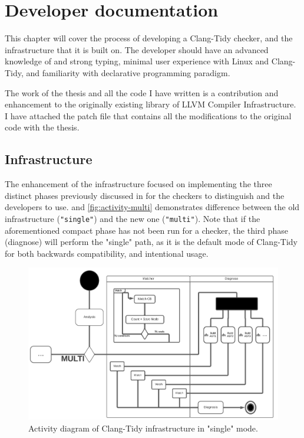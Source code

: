 
\chapter{Developer documentation}
\label{ch:impl}

This chapter will cover the process of developing a Clang-Tidy checker, and the infrastructure that it is built on.
The developer should have an advanced knowledge of \CC{} and strong typing, minimal user experience with Linux and
Clang-Tidy, and familiarity with declarative programming paradigm.

The work of the thesis and all the code I have written is a contribution and enhancement to the originally existing library
of LLVM Compiler Infrastructure. I have attached the patch file that contains all the modifications to the original code
with the thesis.

\section{Infrastructure}
\label{sec:dev-infra}

The enhancement of the infrastructure focused on implementing the three distinct phases previously discussed in 
for the checkers to distinguish and the developers to use.
 and \cref{fig:activity-multi} demonstrates difference between the old infrastructure
(\texttt{"single"}) and the new one (\texttt{"multi"}).
Note that if the aforementioned compact phase has not been run for a checker, the third phase (diagnose) will perform the "single"
path, as it is the default mode of Clang-Tidy for both backwards compatibility, and intentional usage.

\begin{figure}[H]
	\includegraphics[width=\linewidth]{images/activity_single.png}
	\caption{Activity diagram of Clang-Tidy infrastructure in "single" mode.}
	\label{fig:activity-single}
\end{figure}

